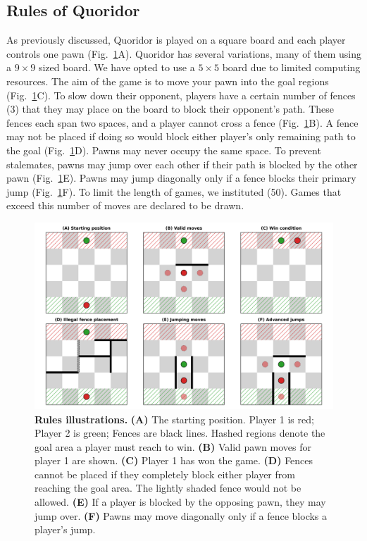 \documentclass[10pt]{article}
\begin{document}
\subsection{Rules of Quoridor}

As previously discussed, Quoridor is played on a square board and each player controls one pawn (Fig.~\ref{fig:rules}A). Quoridor has several variations,  many of them using a $9 \times 9$ sized board. We have opted to use a $5 \times 5$ board due to limited computing resources. The aim of the game is to move your pawn into the goal regions (Fig.~\ref{fig:rules}C). To slow down their opponent, players have a certain number of fences (3) that they may place on the board to block their opponent's path. These fences each span two spaces, and a player cannot cross a fence (Fig.~\ref{fig:rules}B). A fence may not be placed if doing so would block either player's only remaining path to the goal (Fig.~\ref{fig:rules}D). Pawns may never occupy the same space. To prevent stalemates, pawns may jump over each other if their path is blocked by the other pawn (Fig.~\ref{fig:rules}E). Pawns may jump diagonally only if a fence blocks their primary jump (Fig.~\ref{fig:rules}F). To limit the length of games, we instituted  (50). Games that exceed this number of moves are declared to be drawn.

\begin{figure}[H]
    \centering
    \includegraphics[width=\linewidth]{rules_demo.png}
    \caption{\textbf{Rules illustrations.} \textbf{(A)} The starting position. Player 1 is red; Player 2 is green; Fences are black lines. Hashed regions denote the goal area a player must reach to win. \textbf{(B)} Valid pawn moves for player 1 are shown. \textbf{(C)} Player 1 has won the game. \textbf{(D)} Fences cannot be placed if they completely block either player from reaching the goal area. The lightly shaded fence would not be allowed. \textbf{(E)} If a player is blocked by the opposing pawn, they may jump over. \textbf{(F)} Pawns may move diagonally only if a fence blocks a player's jump.}
    \label{fig:rules}
\end{figure}
\end{document}

